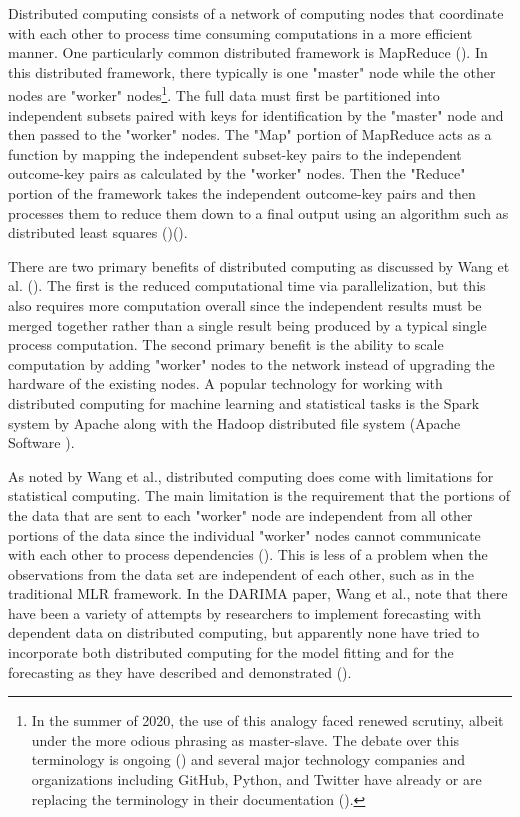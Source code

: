 \documentclass[
]{article}
\begin{document}
Distributed computing consists of a network of computing nodes that coordinate with each other to process time consuming computations in a more efficient manner. One particularly common distributed framework is MapReduce (\cite[p.5]{wang_distributed_2020}). In this distributed framework, there typically is one "master" node while the other nodes are "worker" nodes\footnote{In the summer of 2020, the use of this analogy faced renewed scrutiny, albeit under the more odious phrasing as master-slave. The debate over this terminology is ongoing (\cite{eglash_broken_2007}) and several major technology companies and organizations including GitHub, Python, and Twitter have already or are replacing the terminology in their documentation (\cite{landau_tech_2020}).}.  The full data must first be partitioned into independent subsets paired with keys for identification by the "master" node and then passed to the "worker" nodes. The "Map" portion of MapReduce acts as a function by mapping the independent subset-key pairs to the independent outcome-key pairs as calculated by the "worker" nodes. Then the "Reduce" portion of the framework takes the independent outcome-key pairs and then processes them to reduce them down to a final output using an algorithm such as distributed least squares (\cite{zhu_dlsa_2019})(\cite[p.~5]{wang_distributed_2020}). 

There are two primary benefits of distributed computing as discussed by Wang et al. (\cite*[p.~5]{wang_distributed_2020}). The first is the reduced computational time via parallelization, but this also requires more computation overall since the independent results must be merged together rather than a single result being produced by a typical single process computation. The second primary benefit is the ability to scale computation by adding "worker" nodes to the network instead of upgrading the hardware of the existing nodes. A popular technology for working with distributed computing for machine learning and statistical tasks is the Spark system by Apache along with the Hadoop distributed file system (Apache Software \cite{apache_spark}). 


As noted by Wang et al., distributed computing does come with limitations for statistical computing. The main limitation is the requirement that the portions of the data that are sent to each "worker" node are independent from all other portions of the data since the individual "worker" nodes cannot communicate with each other to process dependencies (\cite*[p.~7]{wang_distributed_2020}). This is less of a problem when the observations from the data set are independent of each other, such as in the traditional MLR framework. In the DARIMA paper, Wang et al., note that there have been a variety of attempts by researchers to implement forecasting with dependent data on distributed computing, but apparently none have tried to incorporate both distributed computing for the model fitting and for the forecasting as they have described and demonstrated (\cite*[p.~7]{wang_distributed_2020}).
\end{document}
